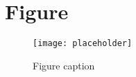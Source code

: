 \documentclass[11pt,fleqn]{book} %
\begin{document}

\section{Figure}

\begin{figure}[h]
\centering\texttt{[image: placeholder]}
\caption{Figure caption}
\end{figure}




\cleardoublepage
{}
\setlength{\columnsep}{0.75cm}
\printindex

\end{document}
